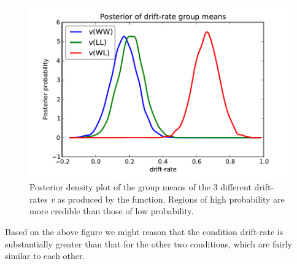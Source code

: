 \documentclass[letterpaper,10pt,english]{article}
\begin{document}
\begin{figure}[H]
\includegraphics[scale=.7]{hddm_demo_fig_06.pdf}
\caption{Posterior density plot of the group means of the 3 different drift-rates \emph{v} as produced by the  function. Regions of high probability are more credible than those of low probability.}
\label{fig.post_drift}
\end{figure}
Based on the above figure we might reason that the  condition drift-rate is substantially greater than that for the other two conditions, which are fairly similar to each other.
\end{document}
